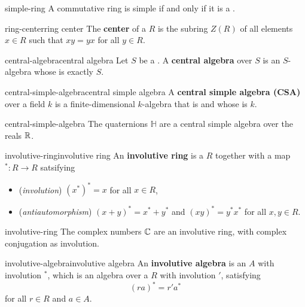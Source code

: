 \begin{example}{simple-ring}
    A commutative ring is simple if and only if it is a .
\end{example}

\begin{topic}{ring-center}{ring center}
    The \textbf{center} of a  $R$ is the subring $Z(R)$ of all elements $x \in R$ such that $xy = yx$ for all $y \in R$.
\end{topic}

\begin{topic}{central-algebra}{central algebra}
    Let $S$ be a . A \textbf{central algebra} over $S$ is an $S$-algebra whose  is exactly $S$.
\end{topic}

\begin{topic}{central-simple-algebra}{central simple algebra}
    A \textbf{central simple algebra (CSA)} over a field $k$ is a finite-dimensional $k$-algebra that is  and whose  is $k$.
\end{topic}

\begin{example}{central-simple-algebra}
    The quaternions $\mathbb{H}$ are a central simple algebra over the reals $\mathbb{R}$.
\end{example}

\begin{topic}{involutive-ring}{involutive ring}
    An \textbf{involutive ring} is a  $R$ together with a map $^* : R \to R$ satsifying
    \begin{itemize}
        \item (\textit{involution}) $(x^*)^* = x$ for all $x \in R$,
        \item (\textit{antiautomorphism}) $(x + y)^* = x^* + y^*$ and $(xy)^* = y^* x^*$ for all $x, y \in R$.
    \end{itemize}
\end{topic}

\begin{example}{involutive-ring}
    The complex numbers $\mathbb{C}$ are an involutive ring, with complex conjugation as involution.
\end{example}

\begin{topic}{involutive-algebra}{involutive algebra}
    An \textbf{involutive algebra} is an  $A$ with involution $^*$, which is an algebra over a  $R$ with involution $'$, satisfying
    \[ (ra)^* = r' a^* \]
    for all $r \in R$ and $a \in A$.
\end{topic}

